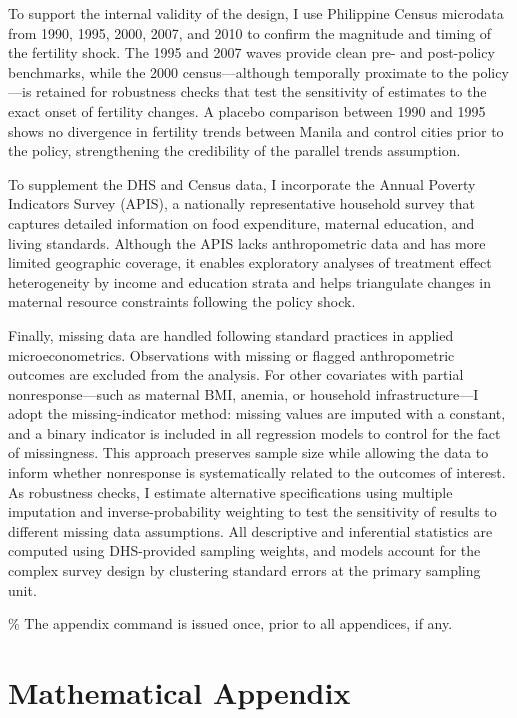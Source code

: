 \documentclass[]{AEA}
\begin{document}
To support the internal validity of the design, I use Philippine Census
microdata from 1990, 1995, 2000, 2007, and 2010 to confirm the magnitude
and timing of the fertility shock. The 1995 and 2007 waves provide clean
pre- and post-policy benchmarks, while the 2000 census---although
temporally proximate to the policy---is retained for robustness checks
that test the sensitivity of estimates to the exact onset of fertility
changes. A placebo comparison between 1990 and 1995 shows no divergence
in fertility trends between Manila and control cities prior to the
policy, strengthening the credibility of the parallel trends assumption.

To supplement the DHS and Census data, I incorporate the Annual Poverty
Indicators Survey (APIS), a nationally representative household survey
that captures detailed information on food expenditure, maternal
education, and living standards. Although the APIS lacks anthropometric
data and has more limited geographic coverage, it enables exploratory
analyses of treatment effect heterogeneity by income and education
strata and helps triangulate changes in maternal resource constraints
following the policy shock.

Finally, missing data are handled following standard practices in
applied microeconometrics. Observations with missing or flagged
anthropometric outcomes are excluded from the analysis. For other
covariates with partial nonresponse---such as maternal BMI, anemia, or
household infrastructure---I adopt the missing-indicator method: missing
values are imputed with a constant, and a binary indicator is included
in all regression models to control for the fact of missingness. This
approach preserves sample size while allowing the data to inform whether
nonresponse is systematically related to the outcomes of interest. As
robustness checks, I estimate alternative specifications using multiple
imputation and inverse-probability weighting to test the sensitivity of
results to different missing data assumptions. All descriptive and
inferential statistics are computed using DHS-provided sampling weights,
and models account for the complex survey design by clustering standard
errors at the primary sampling unit.




\% The appendix command is issued once, prior to all appendices, if any.
\appendix

\section{Mathematical Appendix}
\end{document}
